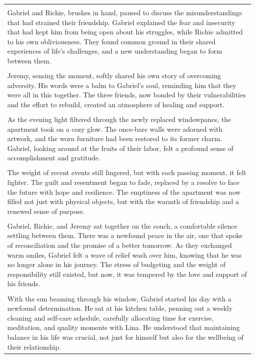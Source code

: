 \begin{small}
\begin{longtable}{p{}}
\\
\\
Gabriel and Richie, brushes in hand, paused to discuss the misunderstandings that had strained their friendship. Gabriel explained the fear and insecurity that had kept him from being open about his struggles, while Richie admitted to his own obliviousness. They found common ground in their shared experiences of life's challenges, and a new understanding began to form between them.
\\
\\
Jeremy, sensing the moment, softly shared his own story of overcoming adversity. His words were a balm to Gabriel's soul, reminding him that they were all in this together. The three friends, now bonded by their vulnerabilities and the effort to rebuild, created an atmosphere of healing and support.
\\
\\
As the evening light filtered through the newly replaced windowpanes, the apartment took on a cozy glow. The once-bare walls were adorned with artwork, and the worn furniture had been restored to its former charm. Gabriel, looking around at the fruits of their labor, felt a profound sense of accomplishment and gratitude.
\\
\\
The weight of recent events still lingered, but with each passing moment, it felt lighter. The guilt and resentment began to fade, replaced by a resolve to face the future with hope and resilience. The emptiness of the apartment was now filled not just with physical objects, but with the warmth of friendship and a renewed sense of purpose.
\\
\\
Gabriel, Richie, and Jeremy sat together on the couch, a comfortable silence settling between them. There was a newfound peace in the air, one that spoke of reconciliation and the promise of a better tomorrow. As they exchanged warm smiles, Gabriel felt a wave of relief wash over him, knowing that he was no longer alone in his journey. The stress of budgeting and the weight of responsibility still existed, but now, it was tempered by the love and support of his friends.
\\
\\
With the sun beaming through his window, Gabriel started his day with a newfound determination. He sat at his kitchen table, penning out a weekly cleaning and self-care schedule, carefully allocating time for exercise, meditation, and quality moments with Lina. He understood that maintaining balance in his life was crucial, not just for himself but also for the wellbeing of their relationship.

\end{longtable}
\end{small}
